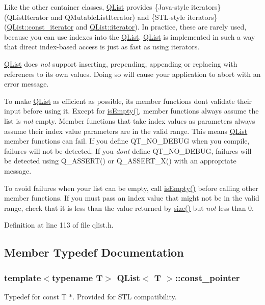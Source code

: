 Like the other container classes, \hyperlink{class_q_list}{Q\+List} provides \{Java-\/style iterators\} (Q\+List\+Iterator and Q\+Mutable\+List\+Iterator) and \{S\+T\+L-\/style iterators\} (\hyperlink{class_q_list_1_1const__iterator}{Q\+List\+::const\+\_\+iterator} and \hyperlink{class_q_list_1_1iterator}{Q\+List\+::iterator}). In practice, these are rarely used, because you can use indexes into the \hyperlink{class_q_list}{Q\+List}. \hyperlink{class_q_list}{Q\+List} is implemented in such a way that direct index-\/based access is just as fast as using iterators.

\hyperlink{class_q_list}{Q\+List} does {\itshape not} support inserting, prepending, appending or replacing with references to its own values. Doing so will cause your application to abort with an error message.

To make \hyperlink{class_q_list}{Q\+List} as efficient as possible, its member functions don\textquotesingle{}t validate their input before using it. Except for \hyperlink{class_q_list_a7425e13d514dd7adc3cf210679eea5c3}{is\+Empty()}, member functions always assume the list is {\itshape not} empty. Member functions that take index values as parameters always assume their index value parameters are in the valid range. This means \hyperlink{class_q_list}{Q\+List} member functions can fail. If you define Q\+T\+\_\+\+N\+O\+\_\+\+D\+E\+B\+UG when you compile, failures will not be detected. If you {\itshape don\textquotesingle{}t} define Q\+T\+\_\+\+N\+O\+\_\+\+D\+E\+B\+UG, failures will be detected using Q\+\_\+\+A\+S\+S\+E\+R\+T() or Q\+\_\+\+A\+S\+S\+E\+R\+T\+\_\+\+X() with an appropriate message.

To avoid failures when your list can be empty, call \hyperlink{class_q_list_a7425e13d514dd7adc3cf210679eea5c3}{is\+Empty()} before calling other member functions. If you must pass an index value that might not be in the valid range, check that it is less than the value returned by \hyperlink{class_q_list_a2ee18cf0bec5e1d0951a1ca1ccfb93fe}{size()} but {\itshape not} less than 0.

Definition at line 113 of file qlist.\+h.



\subsection{Member Typedef Documentation}
\subsubsection[{\texorpdfstring{const\+\_\+pointer}{const_pointer}}]{\setlength{\rightskip}{0pt plus 5cm}template$<$typename T$>$ {\bf Q\+List}$<$ T $>$\+::{\bf const\+\_\+pointer}}\hypertarget{class_q_list_ac2d1086a1098740e3ee2ed66e4f63f7b}{}\label{class_q_list_ac2d1086a1098740e3ee2ed66e4f63f7b}
Typedef for const T $\ast$. Provided for S\+TL compatibility. 


